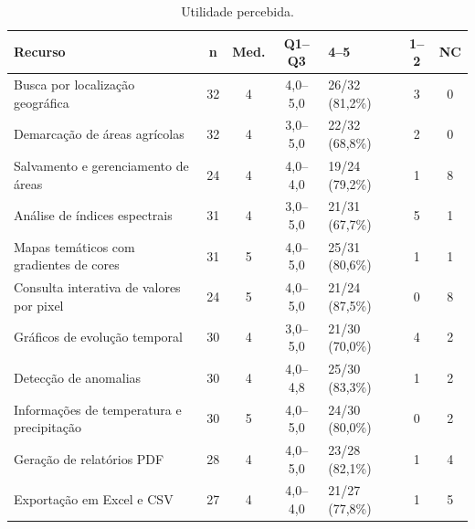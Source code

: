 \begin{table}[htbp]
\centering\small
\caption{Utilidade percebida.}
\label{tab:usuarios-utilidade}
\begin{tabular}{p{}cccp{}cc}
\hline
Recurso & n & Med. & Q1--Q3 & 4--5 & 1--2 & NC\\ \hline
Busca por localização geográfica & 32 & 4 & 4,0--5,0 & 26/32 (81,2\%) & 3 & 0\\
Demarcação de áreas agrícolas & 32 & 4 & 3,0--5,0 & 22/32 (68,8\%) & 2 & 0\\
Salvamento e gerenciamento de áreas & 24 & 4 & 4,0--4,0 & 19/24 (79,2\%) & 1 & 8\\
Análise de índices espectrais & 31 & 4 & 3,0--5,0 & 21/31 (67,7\%) & 5 & 1\\
Mapas temáticos com gradientes de cores & 31 & 5 & 4,0--5,0 & 25/31 (80,6\%) & 1 & 1\\
Consulta interativa de valores por pixel & 24 & 5 & 4,0--5,0 & 21/24 (87,5\%) & 0 & 8\\
Gráficos de evolução temporal & 30 & 4 & 3,0--5,0 & 21/30 (70,0\%) & 4 & 2\\
Detecção de anomalias & 30 & 4 & 4,0--4,8 & 25/30 (83,3\%) & 1 & 2\\
Informações de temperatura e precipitação & 30 & 5 & 4,0--5,0 & 24/30 (80,0\%) & 0 & 2\\
Geração de relatórios PDF & 28 & 4 & 4,0--5,0 & 23/28 (82,1\%) & 1 & 4\\
Exportação em Excel e CSV & 27 & 4 & 4,0--4,0 & 21/27 (77,8\%) & 1 & 5\\
\hline
\end{tabular}
\end{table}
